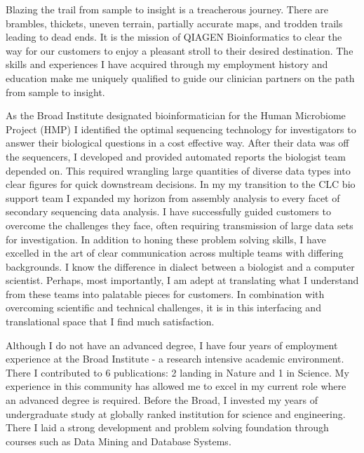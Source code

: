 \documentclass[10pt,letterpaper,sigleft]{newlfm}
\begin{document}
\begin{newlfm}


Blazing the trail from sample to insight is a treacherous journey. There are brambles, thickets, uneven terrain, partially accurate maps, and trodden trails leading to dead ends. It is the mission of QIAGEN Bioinformatics to clear the way for our customers to enjoy a pleasant stroll to their desired destination. The skills and experiences I have acquired through my employment history and education make me uniquely qualified to guide our clinician partners on the path from sample to insight.

As the Broad Institute designated bioinformatician for the Human Microbiome Project (HMP) I identified the optimal sequencing technology for investigators to answer their biological questions in a cost effective way.  After their data was off the sequencers, I developed and provided automated reports the biologist team depended on. This required wrangling large quantities of diverse data types into clear figures for quick downstream decisions. In my my transition to the CLC bio support team I expanded my horizon from assembly analysis to every facet of secondary sequencing data analysis. I have successfully guided customers to overcome the challenges they face, often requiring transmission of large data sets for investigation. In addition to honing these problem solving skills, I have excelled in the art of clear communication across multiple teams with differing backgrounds. I know the difference in dialect between a biologist and a computer scientist. Perhaps, most importantly, I am adept at translating what I understand from these teams into palatable pieces for customers. In combination with overcoming scientific and technical challenges, it is in this interfacing and translational space that I find much satisfaction. 

Although I do not have an advanced degree, I have four years of employment experience at the Broad Institute - a research intensive academic environment. There I contributed to 6 publications:  2 landing in Nature and 1 in Science. My experience in this community has allowed me to excel in my current role where an advanced degree is required. Before the Broad, I invested my years of undergraduate study at globally ranked institution for science and engineering. There I laid a strong development and problem solving foundation through courses such as Data Mining and Database Systems.


\end{newlfm}
\end{document}
